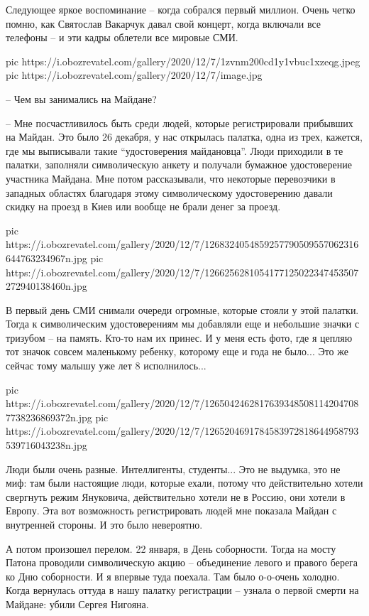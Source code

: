 Следующее яркое воспоминание – когда собрался первый миллион. Очень четко
помню, как Святослав Вакарчук давал свой концерт, когда включали все телефоны –
и эти кадры облетели все мировые СМИ.

\ifcmt
pic https://i.obozrevatel.com/gallery/2020/12/7/1zvnm200cd1y1vbuc1xzeqg.jpeg
pic https://i.obozrevatel.com/gallery/2020/12/7/image.jpg
\fi

– Чем вы занимались на Майдане?

– Мне посчастливилось быть среди людей, которые регистрировали прибывших на
Майдан. Это было 26 декабря, у нас открылась палатка, одна из трех, кажется,
где мы выписывали такие \enquote{удостоверения майдановца}. Люди приходили в те
палатки, заполняли символическую анкету и получали бумажное удостоверение
участника Майдана. Мне потом рассказывали, что некоторые перевозчики в западных
областях благодаря этому символическому удостоверению давали скидку на проезд в
Киев или вообще не брали денег за проезд.

\ifcmt
pic https://i.obozrevatel.com/gallery/2020/12/7/1268324054859257790509557062316644763234967n.jpg
pic https://i.obozrevatel.com/gallery/2020/12/7/1266256281054177125022347453507272940138460n.jpg
\fi

В первый день СМИ снимали очереди огромные, которые стояли у этой палатки.
Тогда к символическим удостоверениям мы добавляли еще и небольшие значки с
тризубом – на память. Кто-то нам их принес. И у меня есть фото, где я цепляю
тот значок совсем маленькому ребенку, которому еще и года не было... Это же
сейчас тому малышу уже лет 8 исполнилось...

\ifcmt
pic https://i.obozrevatel.com/gallery/2020/12/7/12650424628176393485081142047087738236869372n.jpg
pic https://i.obozrevatel.com/gallery/2020/12/7/1265204691784583972818644958793539716043238n.jpg
\fi

Люди были очень разные. Интеллигенты, студенты... Это не выдумка, это не миф:
там были настоящие люди, которые ехали, потому что действительно хотели
свергнуть режим Януковича, действительно хотели не в Россию, они хотели в
Европу. Эта вот возможность регистрировать людей мне показала Майдан с
внутренней стороны. И это было невероятно.

А потом произошел перелом. 22 января, в День соборности. Тогда на мосту Патона
проводили символическую акцию – объединение левого и правого берега ко Дню
соборности. И я впервые туда поехала. Там было о-о-очень холодно. Когда
вернулась оттуда в нашу палатку регистрации – узнала о первой смерти на
Майдане: убили Сергея Нигояна.

